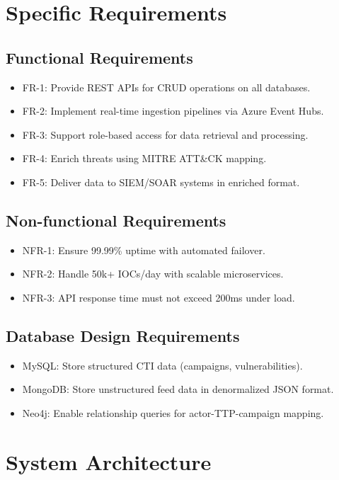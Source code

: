 \documentclass[12pt]{article}
\begin{document}
\section{Specific Requirements}
\subsection{Functional Requirements}
\begin{itemize}
    \item FR-1: Provide REST APIs for CRUD operations on all databases.
    \item FR-2: Implement real-time ingestion pipelines via Azure Event Hubs.
    \item FR-3: Support role-based access for data retrieval and processing.
    \item FR-4: Enrich threats using MITRE ATT&CK mapping.
    \item FR-5: Deliver data to SIEM/SOAR systems in enriched format.
\end{itemize}

\subsection{Non-functional Requirements}
\begin{itemize}
    \item NFR-1: Ensure 99.99\% uptime with automated failover.
    \item NFR-2: Handle 50k+ IOCs/day with scalable microservices.
    \item NFR-3: API response time must not exceed 200ms under load.
\end{itemize}

\subsection{Database Design Requirements}
\begin{itemize}
    \item MySQL: Store structured CTI data (campaigns, vulnerabilities).
    \item MongoDB: Store unstructured feed data in denormalized JSON format.
    \item Neo4j: Enable relationship queries for actor-TTP-campaign mapping.
\end{itemize}

\section{System Architecture}
\end{document}
